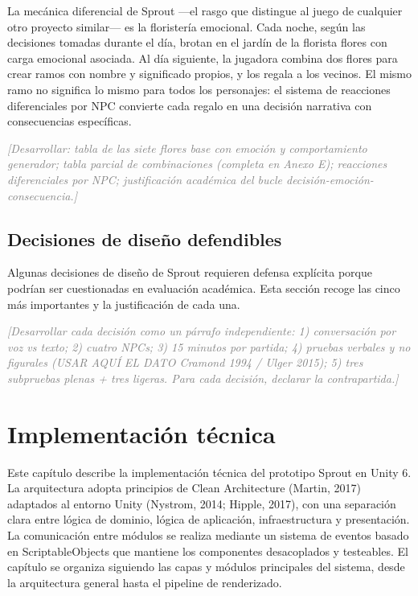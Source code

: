 \documentclass[12pt,twoside,titlepage]{report}
\begin{document}
La mecánica diferencial de Sprout ---el rasgo que distingue al juego de cualquier otro proyecto similar--- es la floristería emocional. Cada noche, según las decisiones tomadas durante el día, brotan en el jardín de la florista flores con carga emocional asociada. Al día siguiente, la jugadora combina dos flores para crear ramos con nombre y significado propios, y los regala a los vecinos. El mismo ramo no significa lo mismo para todos los personajes: el sistema de reacciones diferenciales por NPC convierte cada regalo en una decisión narrativa con consecuencias específicas.

\textcolor{gray}{\textit{[Desarrollar: tabla de las siete flores base con emoción y comportamiento generador; tabla parcial de combinaciones (completa en Anexo E); reacciones diferenciales por NPC; justificación académica del bucle decisión-emoción-consecuencia.]}}

\section{Decisiones de diseño defendibles}

Algunas decisiones de diseño de Sprout requieren defensa explícita porque podrían ser cuestionadas en evaluación académica. Esta sección recoge las cinco más importantes y la justificación de cada una.

\textcolor{gray}{\textit{[Desarrollar cada decisión como un párrafo independiente: 1) conversación por voz vs texto; 2) cuatro NPCs; 3) 15 minutos por partida; 4) pruebas verbales y no figurales (USAR AQUÍ EL DATO Cramond 1994 / Ulger 2015); 5) tres subpruebas plenas + tres ligeras. Para cada decisión, declarar la contrapartida.]}}

\chapter{Implementación técnica}

Este capítulo describe la implementación técnica del prototipo Sprout en Unity 6. La arquitectura adopta principios de Clean Architecture (Martin, 2017) adaptados al entorno Unity (Nystrom, 2014; Hipple, 2017), con una separación clara entre lógica de dominio, lógica de aplicación, infraestructura y presentación. La comunicación entre módulos se realiza mediante un sistema de eventos basado en ScriptableObjects que mantiene los componentes desacoplados y testeables. El capítulo se organiza siguiendo las capas y módulos principales del sistema, desde la arquitectura general hasta el pipeline de renderizado.
\end{document}
